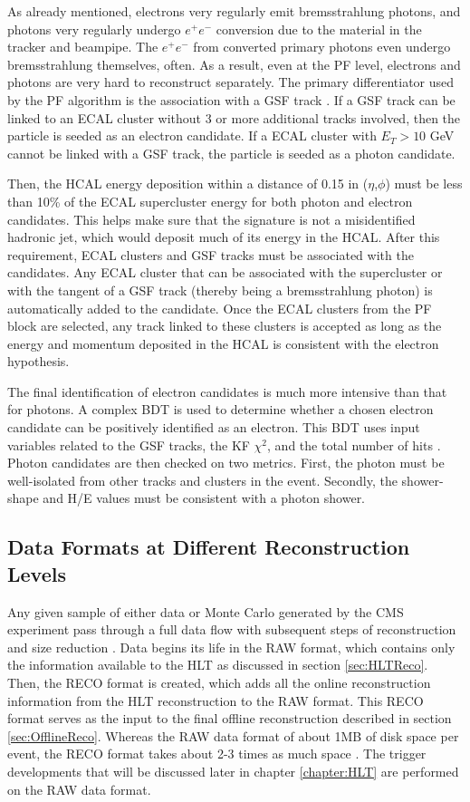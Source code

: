 \documentclass[12pt]{ucsddissertation}
\begin{document}
As already mentioned, electrons very regularly emit bremsstrahlung photons, and photons very regularly undergo $e^+ e^-$ conversion due to the material in the tracker and beampipe. The $e^+ e^-$ from converted primary photons even undergo bremsstrahlung themselves, often. As a result, even at the PF level, electrons and photons are very hard to reconstruct separately. The primary differentiator used by the PF algorithm is the association with a GSF track \cite{ParticleFlow}. If a GSF track can be linked to an ECAL cluster without 3 or more additional tracks involved, then the particle is seeded as an electron candidate. If a ECAL cluster with $E_T > 10$ GeV cannot be linked with a GSF track, the particle is seeded as a photon candidate.

Then, the HCAL energy deposition within a distance of 0.15 in ($\eta$,$\phi$) must be less than 10\% of the ECAL supercluster energy for both photon and electron candidates. This helps make sure that the signature is not a misidentified hadronic jet, which would deposit much of its energy in the HCAL. After this requirement, ECAL clusters and GSF tracks must be associated with the candidates. Any ECAL cluster that can be associated with the supercluster or with the tangent of a GSF track (thereby being a bremsstrahlung photon) is automatically added to the candidate. Once the ECAL clusters from the PF block are selected, any track linked to these clusters is accepted as long as the energy and momentum deposited in the HCAL is consistent with the electron hypothesis.

The final identification of electron candidates is much more intensive than that for photons. A complex BDT is used to determine whether a chosen electron candidate can be positively identified as an electron. This BDT uses input variables related to the GSF tracks, the KF $\chi^2$, and the total number of hits \cite{ParticleFlow}. Photon candidates are then checked on two metrics. First, the photon must be well-isolated from other tracks and clusters in the event. Secondly, the shower-shape and H/E values must be consistent with a photon shower. 

\subsection{Data Formats at Different Reconstruction Levels}\label{sec:DataTiers}
Any given sample of either data or Monte Carlo generated by the CMS experiment pass through a full data flow with subsequent steps of reconstruction and size reduction \cite{MiniAOD}. Data begins its life in the RAW format, which contains only the information available to the HLT as discussed in section \ref{sec:HLTReco}. Then, the RECO format is created, which adds all the online reconstruction information from the HLT reconstruction to the RAW format. This RECO format serves as the input to the final offline reconstruction described in section \ref{sec:OfflineReco}. Whereas the RAW data format of about 1MB of disk space per event, the RECO format takes about 2-3 times as much space \cite{NanoAOD}. The trigger developments that will be discussed later in chapter \ref{chapter:HLT} are performed on the RAW data format.
\end{document}
